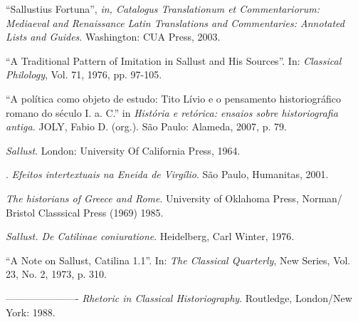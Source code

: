 \begin{bibliohedra}
 “Sallustius Fortuna”, \emph{in, Catalogus Translationum et Commentariorum: Mediaeval and Renaissance Latin Translations and Commentaries: Annotated Lists and Guides}. Washington: CUA Press, 2003.



 “A Traditional Pattern of Imitation in Sallust and His Sources”. In: \emph{Classical Philology}, Vol. 71, 1976, pp. 97-105.

 “A política como objeto de estudo: Tito Lívio e o pensamento historiográfico romano do século I. a. C.”  in \emph{História e retórica: ensaios sobre historiografia antiga.} JOLY, Fabio D. (org.). São Paulo: Alameda, 2007, p. 79. 
 
  \emph{Sallust}. London: University Of California Press, 1964.

 

. \emph{Efeitos intertextuais na Eneida de Virgílio}. São Paulo, Humanitas, 2001.



 \emph{The historians of Greece and Rome}. University of Oklahoma Press, Norman/ Bristol Classsical Press (1969) 1985.


 \emph{Sallust. De Catilinae coniuratione}. Heidelberg, Carl Winter, 1976.



 “A Note on Sallust, Catilina 1.1”. In: \emph{The Classical Quarterly}, New Series, Vol. 23, No. 2, 1973, p. 310.

---------------------- \emph{Rhetoric in Classical Historiography}. Routledge, London/New York: 1988.


\end{bibliohedra}

 






 
